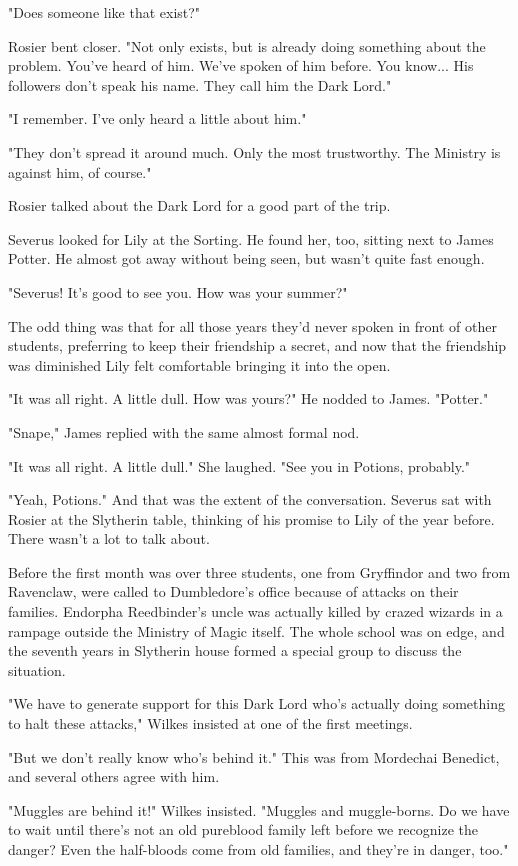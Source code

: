 "Does someone like that exist?"

Rosier bent closer. "Not only exists, but is already doing something about the problem. You've heard of him. We've spoken of him before. You know... His followers don't speak his name. They call him the Dark Lord."

"I remember. I've only heard a little about him."

"They don't spread it around much. Only the most trustworthy. The Ministry is against him, of course."

Rosier talked about the Dark Lord for a good part of the trip.

Severus looked for Lily at the Sorting. He found her, too, sitting next to James Potter. He almost got away without being seen, but wasn't quite fast enough.

"Severus! It's good to see you. How was your summer?"

The odd thing was that for all those years they'd never spoken in front of other students, preferring to keep their friendship a secret, and now that the friendship was diminished Lily felt comfortable bringing it into the open.

"It was all right. A little dull. How was yours?" He nodded to James. "Potter."

"Snape," James replied with the same almost formal nod.

"It was all right. A little dull." She laughed. "See you in Potions, probably."

"Yeah, Potions." And that was the extent of the conversation. Severus sat with Rosier at the Slytherin table, thinking of his promise to Lily of the year before. There wasn't a lot to talk about.

Before the first month was over three students, one from Gryffindor and two from Ravenclaw, were called to Dumbledore's office because of attacks on their families. Endorpha Reedbinder's uncle was actually killed by crazed wizards in a rampage outside the Ministry of Magic itself. The whole school was on edge, and the seventh years in Slytherin house formed a special group to discuss the situation.

"We have to generate support for this Dark Lord who's actually doing something to halt these attacks," Wilkes insisted at one of the first meetings.

"But we don't really know who's behind it." This was from Mordechai Benedict, and several others agree with him.

"Muggles are behind it!" Wilkes insisted. "Muggles and muggle-borns. Do we have to wait until there's not an old pureblood family left before we recognize the danger? Even the half-bloods come from old families, and they're in danger, too."

